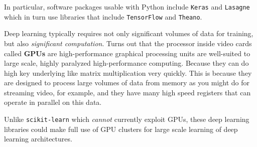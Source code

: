 \begin{multicols}{2}
In particular, software packages usable with Python include \texttt{Keras} and \texttt{Lasagne} which in turn use libraries that include \texttt{TensorFlow} and \texttt{Theano}.

Deep learning typically requires not only significant volumes of data for training, but also \emph{significant computation}. Turns out that the processor inside video cards called \textbf{GPUs} are high-performance graphical processing units are well-suited to large scale, highly paralyzed high-performance computing. Because they can do high key underlying like matrix multiplication very quickly. This is because they are designed to process large volumes of data from memory as you might do for streaming video, for example, and they have many high speed registers that can operate in parallel on this data. 

Unlike \texttt{scikit-learn} which \emph{cannot} currently exploit GPUs, these deep learning libraries could make full use of GPU clusters for large scale learning of deep learning architectures. 

\end{multicols}